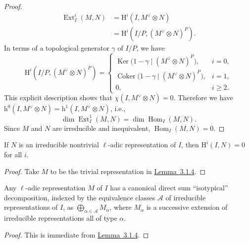 \begin{proof}
\[
\begin{aligned}
  \operatorname{Ext}^i_I(M,N)
  &= \mathrm{H}^i(I,M^{\vee}\otimes N)\\
  &= \mathrm{H}^i(I/P,(M^{\vee}\otimes N)^P).
\end{aligned}
\]
In terms of a topological generator \(\gamma\) of \(I/P\), we have
\[
\mathrm{H}^i(I/P,(M^{\vee}\otimes N)^P)
=
\begin{cases}
  \operatorname{Ker}\bigl(1-\gamma\mid(M^{\vee}\otimes N)^P\bigr),
    & i=0,\\
  \operatorname{Coker}\bigl(1-\gamma\mid(M^{\vee}\otimes N)^P\bigr),
    & i=1,\\
  0, & i\geq 2.
\end{cases}
\]
This explicit description shows that
\(\chi(I,M^{\vee}\otimes N)=0\). Therefore we have
\(\mathrm{h}^0(I,M^{\vee}\otimes N)=\mathrm{h}^1(I,M^{\vee}\otimes N)\),
i.e.,
\[
  \dim\operatorname{Ext}^1_I(M,N)=\dim\operatorname{Hom}_I(M,N).
\]
Since \(M\) and \(N\) are irreducible and inequivalent,
\(\operatorname{Hom}_I(M,N)=0\).
\end{proof}

If \(N\) is an irreducible nontrivial \(\ell\)-adic representation of \(I\),
then \(\mathrm{H}^i(I,N)=0\) for all \(i\).

\begin{proof}
Take \(M\) to be the trivial representation in
\hyperref[lem:3.1.4]{Lemma~3.1.4}.
\end{proof}

Any \(\ell\)-adic representation \(M\) of \(I\) has a canonical direct sum
``isotypical'' decomposition, indexed by the equivalence classes \(\mathcal{A}\)
of irreducible representations of \(I\), as
\(\bigoplus_{\alpha\in\mathcal{A}} M_\alpha\), where \(M_\alpha\) is a
successive extension of irreducible representations all of type \(\alpha\).

\begin{proof}
This is immediate from \hyperref[lem:3.1.4]{Lemma~3.1.4}.
\end{proof}

